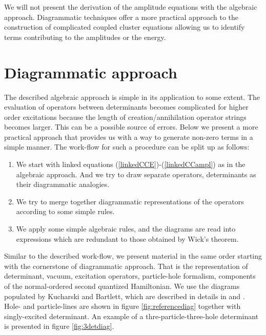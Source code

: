 \documentclass[twoside,english]{uiofysmaster}
\begin{document}
We will not present the derivation of the amplitude equations with the
algebraic approach.  Diagrammatic techniques offer a more practical
approach to the construction of complicated coupled cluster equations
allowing us to identify terms contributing to the amplitudes or the
energy.


\section{Diagrammatic approach}

The described algebraic approach is simple in its application to some
extent. The evaluation of operators between determinants becomes
complicated for higher order excitations because the length of
creation/annihilation operator strings becomes larger. This can be a
possible source of errors. Below we present a more practical approach
that provides us with a way to generate non-zero terms in a simple
manner. The work-flow for such a procedure can be split up as follows:
\begin{enumerate}
	\item We start with linked equations (\ref{linkedCCE})-(\ref{linkedCCampl}) as in the algebraic approach. And we try to draw separate operators, determinants as their diagrammatic analogies.
	\item We try to merge together diagrammatic representations of the operators according to some simple rules.
	\item We apply some simple algebraic rules, and the diagrams are read into expressions which are redundant to those obtained by Wick's theorem.
\end{enumerate}

Similar to the described work-flow, we present material in the same
order starting with the cornerstone of diagrammatic approach. That is
the representation of determinant, vacuum, excitation operators,
particle-hole formalism, components of the normal-ordered second
quantized Hamiltonian.  We use the diagrams populated by Kucharski and
Bartlett, which are described in details in
\cite{CrawfordIntroductionCoupledCluster2007} and
\cite{HarrisAlgebraicdiagrammaticmethods1992}. Hole- and
particle-lines are shown in figure \ref{fig:referencediag} together
with singly-excited determinant. An example of a thre-particle-three-hole determinant is
presented in figure \ref{fig:3detdiag}.
\end{document}
